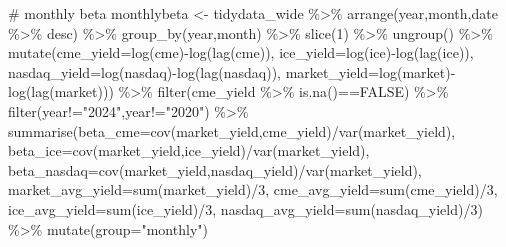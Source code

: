 \documentclass[
  a4paper,
  DIV=11,
  numbers=noendperiod]{scrreprt}
\newenvironment{Shaded}{\begin{snugshade}}{\end{snugshade}}
\newcommand{\AttributeTok}[1]{\textcolor[rgb]{0.40,0.45,0.13}{#1}}
\newcommand{\CommentTok}[1]{\textcolor[rgb]{0.37,0.37,0.37}{#1}}
\newcommand{\ConstantTok}[1]{\textcolor[rgb]{0.56,0.35,0.01}{#1}}
\newcommand{\DecValTok}[1]{\textcolor[rgb]{0.68,0.00,0.00}{#1}}
\newcommand{\FunctionTok}[1]{\textcolor[rgb]{0.28,0.35,0.67}{#1}}
\newcommand{\NormalTok}[1]{\textcolor[rgb]{0.00,0.23,0.31}{#1}}
\newcommand{\OtherTok}[1]{\textcolor[rgb]{0.00,0.23,0.31}{#1}}
\newcommand{\SpecialCharTok}[1]{\textcolor[rgb]{0.37,0.37,0.37}{#1}}
\newcommand{\StringTok}[1]{\textcolor[rgb]{0.13,0.47,0.30}{#1}}
\begin{document}
\begin{Shaded}
\begin{Highlighting}[]
\CommentTok{\# monthly beta}
\NormalTok{monthlybeta }\OtherTok{\textless{}{-}}\NormalTok{ tidydata\_wide }\SpecialCharTok{\%\textgreater{}\%} 
  \FunctionTok{arrange}\NormalTok{(year,month,date }\SpecialCharTok{\%\textgreater{}\%}\NormalTok{ desc) }\SpecialCharTok{\%\textgreater{}\%} 
  \FunctionTok{group\_by}\NormalTok{(year,month) }\SpecialCharTok{\%\textgreater{}\%} 
  \FunctionTok{slice}\NormalTok{(}\DecValTok{1}\NormalTok{) }\SpecialCharTok{\%\textgreater{}\%} 
  \FunctionTok{ungroup}\NormalTok{() }\SpecialCharTok{\%\textgreater{}\%} 
  \FunctionTok{mutate}\NormalTok{(}\AttributeTok{cme\_yield=}\FunctionTok{log}\NormalTok{(cme)}\SpecialCharTok{{-}}\FunctionTok{log}\NormalTok{(}\FunctionTok{lag}\NormalTok{(cme)),}
         \AttributeTok{ice\_yield=}\FunctionTok{log}\NormalTok{(ice)}\SpecialCharTok{{-}}\FunctionTok{log}\NormalTok{(}\FunctionTok{lag}\NormalTok{(ice)),}
         \AttributeTok{nasdaq\_yield=}\FunctionTok{log}\NormalTok{(nasdaq)}\SpecialCharTok{{-}}\FunctionTok{log}\NormalTok{(}\FunctionTok{lag}\NormalTok{(nasdaq)),}
         \AttributeTok{market\_yield=}\FunctionTok{log}\NormalTok{(market)}\SpecialCharTok{{-}}\FunctionTok{log}\NormalTok{(}\FunctionTok{lag}\NormalTok{(market))) }\SpecialCharTok{\%\textgreater{}\%} 
  \FunctionTok{filter}\NormalTok{(cme\_yield }\SpecialCharTok{\%\textgreater{}\%} \FunctionTok{is.na}\NormalTok{()}\SpecialCharTok{==}\ConstantTok{FALSE}\NormalTok{) }\SpecialCharTok{\%\textgreater{}\%} 
  \FunctionTok{filter}\NormalTok{(year}\SpecialCharTok{!=}\StringTok{"2024"}\NormalTok{,year}\SpecialCharTok{!=}\StringTok{"2020"}\NormalTok{) }\SpecialCharTok{\%\textgreater{}\%} 
  \FunctionTok{summarise}\NormalTok{(}\AttributeTok{beta\_cme=}\FunctionTok{cov}\NormalTok{(market\_yield,cme\_yield)}\SpecialCharTok{/}\FunctionTok{var}\NormalTok{(market\_yield),}
            \AttributeTok{beta\_ice=}\FunctionTok{cov}\NormalTok{(market\_yield,ice\_yield)}\SpecialCharTok{/}\FunctionTok{var}\NormalTok{(market\_yield),}
            \AttributeTok{beta\_nasdaq=}\FunctionTok{cov}\NormalTok{(market\_yield,nasdaq\_yield)}\SpecialCharTok{/}\FunctionTok{var}\NormalTok{(market\_yield),}
            \AttributeTok{market\_avg\_yield=}\FunctionTok{sum}\NormalTok{(market\_yield)}\SpecialCharTok{/}\DecValTok{3}\NormalTok{,}
            \AttributeTok{cme\_avg\_yield=}\FunctionTok{sum}\NormalTok{(cme\_yield)}\SpecialCharTok{/}\DecValTok{3}\NormalTok{,}
            \AttributeTok{ice\_avg\_yield=}\FunctionTok{sum}\NormalTok{(ice\_yield)}\SpecialCharTok{/}\DecValTok{3}\NormalTok{,}
            \AttributeTok{nasdaq\_avg\_yield=}\FunctionTok{sum}\NormalTok{(nasdaq\_yield)}\SpecialCharTok{/}\DecValTok{3}\NormalTok{) }\SpecialCharTok{\%\textgreater{}\%} 
  \FunctionTok{mutate}\NormalTok{(}\AttributeTok{group=}\StringTok{"monthly"}\NormalTok{)}


\end{Highlighting}
\end{Shaded}
\end{document}
